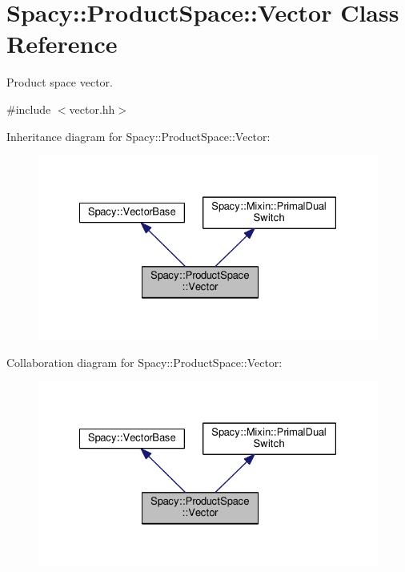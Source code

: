\hypertarget{classSpacy_1_1ProductSpace_1_1Vector}{}\section{Spacy\+:\+:Product\+Space\+:\+:Vector Class Reference}
\label{classSpacy_1_1ProductSpace_1_1Vector}


Product space vector.  




{\ttfamily \#include $<$vector.\+hh$>$}



Inheritance diagram for Spacy\+:\+:Product\+Space\+:\+:Vector\+:\nopagebreak
\begin{figure}[H]
\begin{center}
\leavevmode
\includegraphics[width=328pt]{classSpacy_1_1ProductSpace_1_1Vector__inherit__graph}
\end{center}
\end{figure}


Collaboration diagram for Spacy\+:\+:Product\+Space\+:\+:Vector\+:\nopagebreak
\begin{figure}[H]
\begin{center}
\leavevmode
\includegraphics[width=328pt]{classSpacy_1_1ProductSpace_1_1Vector__coll__graph}
\end{center}
\end{figure}
